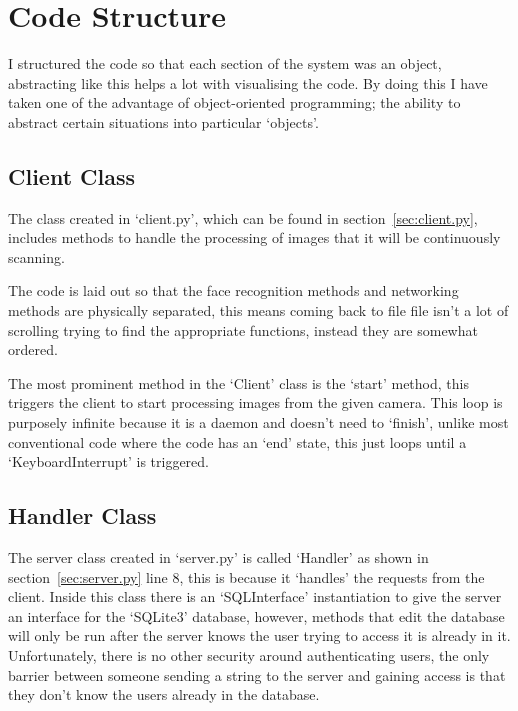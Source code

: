 \documentclass[a4paper]{article}
\begin{document}
\section{Code Structure}
I structured the code so that each section of the system was an object, abstracting like this helps a lot with
visualising the code. By doing this I have taken one of the advantage of object-oriented programming; the ability
to abstract certain situations into particular `objects'.

    \subsection{Client Class}
    \label{sec:clientstructure}
    The class created in `client.py', which can be found in section~\ref{sec:client.py}, includes methods to handle
    the processing of images that it will be continuously scanning. 

    The code is laid out so that the face recognition methods and networking methods are physically separated, this means
    coming back to file file isn't a lot of scrolling trying to find the appropriate functions, instead they are somewhat
    ordered.

    The most prominent method in the `Client' class is the `start' method, this triggers the client to start processing
    images from the given camera. This loop is purposely infinite because it is a daemon and doesn't need to `finish', unlike
    most conventional code where the code has an `end' state, this just loops until a `KeyboardInterrupt' is triggered.

    

    \subsection{Handler Class}
    The server class created in `server.py' is called `Handler' as shown in section~\ref{sec:server.py} line 8, this is 
    because it `handles' the requests from the client. Inside this class there is an `SQLInterface' instantiation to give 
    the server an interface for the `SQLite3' database, however, methods that edit the database will only be run after the 
    server knows the user trying to access it is already in it. Unfortunately, there is no other security around authenticating 
    users, the only barrier between someone sending a string to the server and gaining access is that they don't know the users 
    already in the database.
\end{document}
